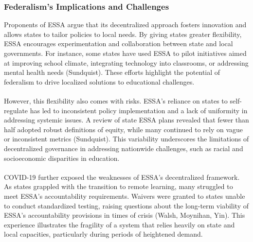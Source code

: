 \documentclass[11pt]{extarticle}
\begin{document}
\subsubsection{Federalism's Implications and Challenges}
Proponents of ESSA argue that its decentralized approach fosters innovation and allows states to tailor policies to local needs. 
By giving states greater flexibility, ESSA encourages experimentation and collaboration between state and local governments. 
For instance, some states have used ESSA to pilot initiatives aimed at improving school climate, integrating technology into classrooms, or addressing mental health needs (Sundquist). These efforts highlight the potential of federalism to drive localized solutions to educational challenges.\\
\\
However, this flexibility also comes with risks. ESSA’s reliance on states to self-regulate has led to inconsistent policy implementation and a lack of uniformity in addressing systemic issues. A review of state ESSA plans revealed that fewer than half adopted robust definitions of equity, while many continued to rely on vague or inconsistent metrics (Sundquist). This variability underscores the limitations of decentralized governance in addressing nationwide challenges, such as racial and socioeconomic disparities in education.\\
\\
COVID-19 further exposed the weaknesses of ESSA’s decentralized framework. As states grappled with the transition to remote learning, many struggled to meet ESSA’s accountability requirements. Waivers were granted to states unable to conduct standardized testing, raising questions about the long-term viability of ESSA’s accountability provisions in times of crisis (Walsh, Moynihan, Yin). This experience illustrates the fragility of a system that relies heavily on state and local capacities, particularly during periods of heightened demand.
\end{document}
